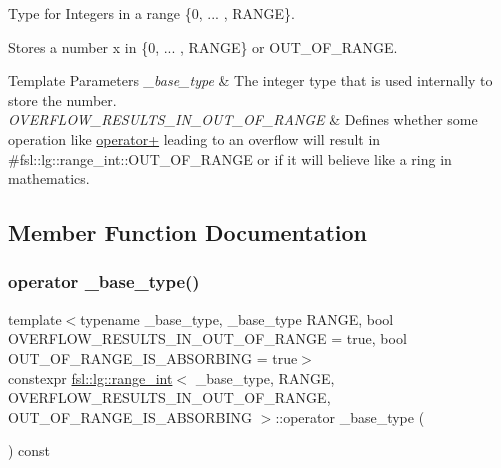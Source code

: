 Type for Integers in a range \{0, ... , R\+A\+N\+GE\}. 

Stores a number x in \{0, ... , R\+A\+N\+GE\} or O\+U\+T\+\_\+\+O\+F\+\_\+\+R\+A\+N\+GE. 
\begin{DoxyTemplParams}{Template Parameters}
{\em \+\_\+base\+\_\+type} & The integer type that is used internally to store the number. \\
\hline
{\em O\+V\+E\+R\+F\+L\+O\+W\+\_\+\+R\+E\+S\+U\+L\+T\+S\+\_\+\+I\+N\+\_\+\+O\+U\+T\+\_\+\+O\+F\+\_\+\+R\+A\+N\+GE} & Defines whether some operation like \mbox{\hyperlink{classfsl_1_1lg_1_1range__int_ae36516b64216806a57986fcedaa07d63}{operator+}} leading to an overflow will result in \#fsl\+::lg\+::range\+\_\+int\+::\+O\+U\+T\+\_\+\+O\+F\+\_\+\+R\+A\+N\+GE or if it will believe like a ring in mathematics. \\
\hline
\end{DoxyTemplParams}


\subsection{Member Function Documentation}
\mbox{\label{classfsl_1_1lg_1_1range__int_a08cd60e0694d2a7a29d86221dc6a702b}} 
\subsubsection{\texorpdfstring{operator \_base\_type()}{operator \_base\_type()}\hspace{0.1cm}{\footnotesize\ttfamily [1/2]}}
{\footnotesize\ttfamily template$<$typename \+\_\+base\+\_\+type, \+\_\+base\+\_\+type R\+A\+N\+GE, bool O\+V\+E\+R\+F\+L\+O\+W\+\_\+\+R\+E\+S\+U\+L\+T\+S\+\_\+\+I\+N\+\_\+\+O\+U\+T\+\_\+\+O\+F\+\_\+\+R\+A\+N\+GE = true, bool O\+U\+T\+\_\+\+O\+F\+\_\+\+R\+A\+N\+G\+E\+\_\+\+I\+S\+\_\+\+A\+B\+S\+O\+R\+B\+I\+NG = true$>$ \\
constexpr \mbox{\hyperlink{classfsl_1_1lg_1_1range__int}{fsl\+::lg\+::range\+\_\+int}}$<$ \+\_\+base\+\_\+type, R\+A\+N\+GE, O\+V\+E\+R\+F\+L\+O\+W\+\_\+\+R\+E\+S\+U\+L\+T\+S\+\_\+\+I\+N\+\_\+\+O\+U\+T\+\_\+\+O\+F\+\_\+\+R\+A\+N\+GE, O\+U\+T\+\_\+\+O\+F\+\_\+\+R\+A\+N\+G\+E\+\_\+\+I\+S\+\_\+\+A\+B\+S\+O\+R\+B\+I\+NG $>$\+::operator \+\_\+base\+\_\+type (\begin{DoxyParamCaption}{ }\end{DoxyParamCaption}) const\hspace{0.3cm}{\ttfamily [inline]}}

